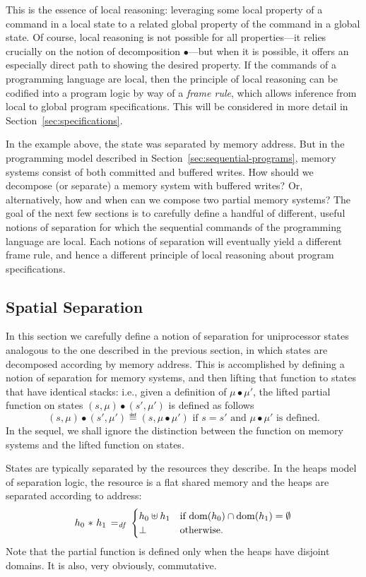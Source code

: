 \documentclass[11pt]{report}
\begin{document}
This is the essence of local reasoning: leveraging some local property of a command in a local state to a related global property of the command in a global state. Of course, local reasoning is not possible for all properties---it relies crucially on the notion of decomposition $\bullet$---but when it is possible, it offers an especially direct path to showing the desired property. If the commands of a programming language are local, then the principle of local reasoning can be codified into a program logic by way of a \emph{frame rule}, which allows inference from local to global program specifications. This will be considered in more detail in Section~\ref{sec:specifications}. 

In the example above, the state was separated by memory address. But in the programming model described in Section~\ref{sec:sequential-programs}, memory systems consist of both committed and buffered writes. How should we decompose (or separate) a memory system with buffered writes? Or, alternatively, how and when can we compose two partial memory systems? The goal of the next few sections is to carefully define a handful of different, useful notions of separation for which the sequential commands of the programming language are local. Each notions of separation will eventually yield a different frame rule, and hence a different principle of local reasoning about program specifications. 

\subsection{Spatial Separation}
\label{sec:sequential-spatial-separation}

In this section we carefully define a notion of separation for uniprocessor states analogous to the one described in the previous section, in which states are decomposed according by memory address. This is accomplished by defining a notion of separation for memory systems, and then lifting that function to states that have identical stacks: i.e., given a definition of $\mu \bullet \mu'$, the lifted partial function on states $(s,\mu) \bullet (s',\mu')$ is defined as follows \[ (s,\mu) \bullet (s',\mu') \eqdef (s,\mu \bullet \mu') \text{~if $s = s'$ and $\mu \bullet \mu'$ is defined.}\] In the sequel, we shall ignore the distinction between the function on memory systems and the lifted function on states. 

States are typically separated by the resources they describe. In the heaps model of separation logic, the resource is a flat shared memory and the heaps are separated according to address: \[ h_0 \operatorname{\,\ast\,} h_1 \operatorname{\;=_{\mathit{df}}\;} \begin{cases}
    h_0 \uplus h_1 & \text{if $\operatorname{\mathrm{dom}}(h_0) \cap \operatorname{\mathrm{dom}}(h_1) = \operatorname{\emptyset}$} \\ 
    \bot & \text{otherwise.}
\end{cases}\] Note that the partial function is defined only when the heaps have disjoint domains. It is also, very obviously, commutative. 
\end{document}
